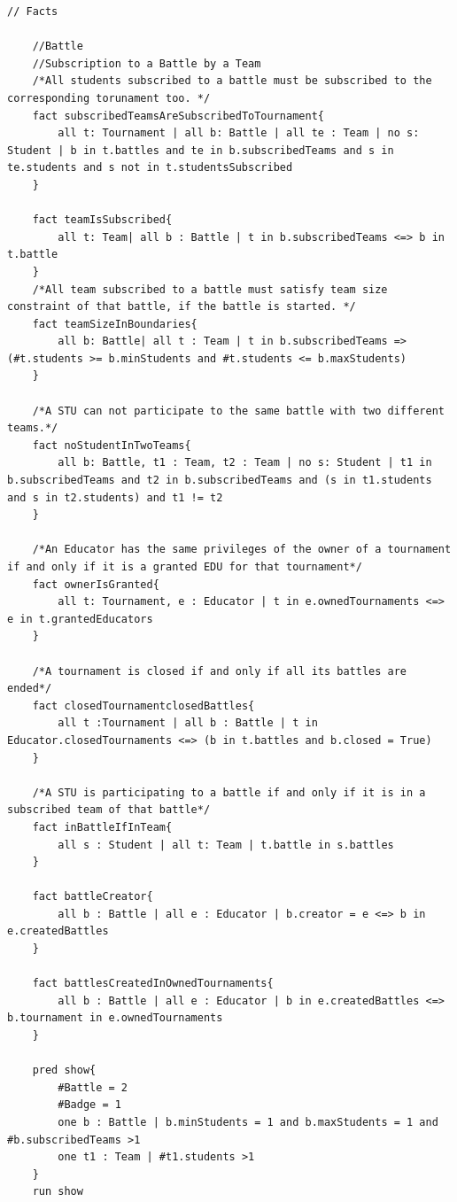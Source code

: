 \begin{lstlisting}[language=Alloy,  label={lst:alloycode}, basicstyle=\fontfamily{Roboto}\selectfont\ttfamily]
    // Facts
    
    //Battle
    //Subscription to a Battle by a Team
    /*All students subscribed to a battle must be subscribed to the corresponding torunament too. */
    fact subscribedTeamsAreSubscribedToTournament{
        all t: Tournament | all b: Battle | all te : Team | no s: Student | b in t.battles and te in b.subscribedTeams and s in te.students and s not in t.studentsSubscribed
    }
    
    fact teamIsSubscribed{
        all t: Team| all b : Battle | t in b.subscribedTeams <=> b in t.battle
    }
    /*All team subscribed to a battle must satisfy team size constraint of that battle, if the battle is started. */
    fact teamSizeInBoundaries{
        all b: Battle| all t : Team | t in b.subscribedTeams => (#t.students >= b.minStudents and #t.students <= b.maxStudents)
    }    
    
    /*A STU can not participate to the same battle with two different teams.*/
    fact noStudentInTwoTeams{
        all b: Battle, t1 : Team, t2 : Team | no s: Student | t1 in b.subscribedTeams and t2 in b.subscribedTeams and (s in t1.students and s in t2.students) and t1 != t2
    }
        
    /*An Educator has the same privileges of the owner of a tournament if and only if it is a granted EDU for that tournament*/
    fact ownerIsGranted{
        all t: Tournament, e : Educator | t in e.ownedTournaments <=> e in t.grantedEducators
    }
    
    /*A tournament is closed if and only if all its battles are ended*/
    fact closedTournamentclosedBattles{
        all t :Tournament | all b : Battle | t in Educator.closedTournaments <=> (b in t.battles and b.closed = True)
    }
    
    /*A STU is participating to a battle if and only if it is in a subscribed team of that battle*/
    fact inBattleIfInTeam{
        all s : Student | all t: Team | t.battle in s.battles
    }
    
    fact battleCreator{
        all b : Battle | all e : Educator | b.creator = e <=> b in e.createdBattles
    }
    
    fact battlesCreatedInOwnedTournaments{
        all b : Battle | all e : Educator | b in e.createdBattles <=> b.tournament in e.ownedTournaments 
    }
    
    pred show{
        #Battle = 2
        #Badge = 1
        one b : Battle | b.minStudents = 1 and b.maxStudents = 1 and #b.subscribedTeams >1
        one t1 : Team | #t1.students >1
    }
    run show
    
\end{lstlisting}
